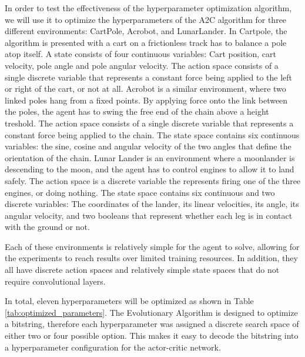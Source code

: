 \documentclass{article}
\begin{document}
In order to test the effectiveness of the hyperparameter optimization algorithm, we will use it to optimize the hyperparameters of the A2C algorithm for three different environments: CartPole, Acrobot, and LunarLander.
In Cartpole, the algorithm is presented with a cart on a frictionless track has to balance a pole atop itself. 
A state consists of four continuous variables: Cart position, cart velocity, pole angle and pole angular velocity. 
The action space consists of a single discrete variable that represents a constant force being applied to the left or right of the cart, or not at all. 
Acrobot is a similar environment, where two linked poles hang from a fixed points. 
By applying force onto the link between the poles, the agent has to swing the free end of the chain above a height treshold. 
The action space consists of a single discrete variable that represents a constant force being applied to the chain. 
The state space contains six continuous variables: the sine, cosine and angular velocity of the two angles that define the orientation of the chain. 
Lunar Lander is an environment where a moonlander is descending to the moon, and the agent has to control engines to allow it to land safely. 
The action space is a discrete variable the represents firing one of the three engines, or doing nothing. 
The state space contains six continuous and two discrete variables: The coordinates of the lander, its linear velocities, its angle, its angular velocity, and two booleans that represent whether each leg is in contact with the ground or not.

Each of these environments is relatively simple for the agent to solve, allowing for the experiments to reach results over limited training resources. 
In addition, they all have discrete action spaces and relatively simple state spaces that do not require convolutional layers.

In total, eleven hyperparameters will be optimized as shown in Table \ref{tab:optimized_parameters}. 
The Evolutionary Algorithm is designed to optimize a bitstring, therefore each hyperparameter was assigned a discrete search space of either two or four possible option. 
This makes it easy to decode the bitstring into a hyperparameter configuration for the actor-critic network. 
\end{document}
